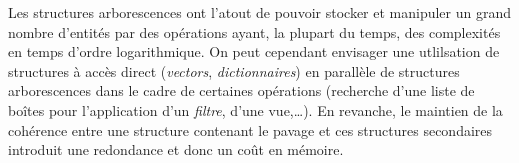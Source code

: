 Les structures arborescences ont l'atout de pouvoir stocker et manipuler un grand nombre d'entités par des opérations ayant, la plupart du temps, des complexités en temps d'ordre logarithmique. On peut cependant envisager une utlilsation de structures à accès direct (\emph{vectors}, \emph{dictionnaires}) en parallèle de structures arborescences dans le cadre de certaines opérations (recherche d'une liste de boîtes pour l'application d'un \emph{filtre}, d'une vue,\dots{}). En revanche, le maintien de la cohérence entre une structure contenant le pavage et ces structures \og secondaires \fg{} introduit une redondance et donc un coût en mémoire.




